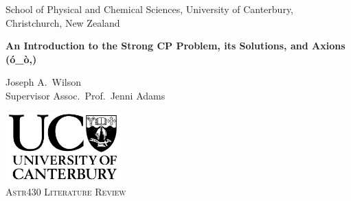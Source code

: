 
\begin{titlepage}


\begin{center} \linespread{0.9}
\Large School of Physical and Chemical Sciences, University of Canterbury, Christchurch, New Zealand
\end{center}

\vspace{3cm}

\begin{center}
\huge\bf
An Introduction to the Strong CP Problem, its Solutions, and Axions (ó\_ò,)
\end{center}


\begin{center} \linespread{1.5}
	\Large
	Joseph A.\ Wilson
\\	Supervisor Assoc.\ Prof.\ Jenni Adams
\end{center}

\iftrue
\vspace{3cm}
\centerline{}
\fi

\vfill

\begin{center} \linespread{1.5}
\includegraphics[width=45mm]{resources/UC.png} \\
\vspace{1ex}
\Large \textsc{Astr430 Literature Review} \\
\end{center}
\vspace{4pt}

\vspace{2cm}

\end{titlepage}

\restoregeometry
